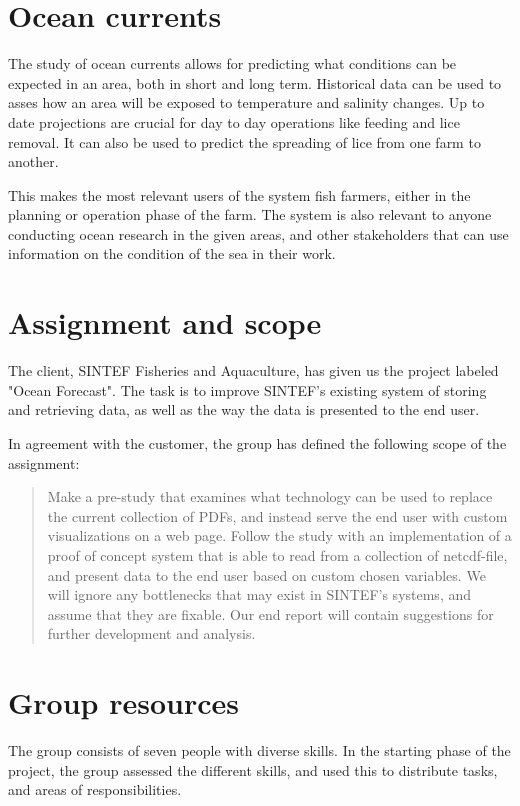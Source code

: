 \documentclass[11pt,a4paper,titlepage,oneside]{report}
\begin{document}
\section{Ocean currents}
The study of ocean currents allows for predicting what conditions can be expected in an area, both in short and long term. Historical data can be used to asses how an area will be exposed to temperature and salinity changes. Up to date projections are crucial for day to day operations like feeding and lice removal. It can also be used to predict the spreading of lice from one farm to another.

This makes the most relevant users of the system fish farmers, either in the planning or operation phase of the farm. The system is also relevant to anyone conducting ocean research in the given areas, and other stakeholders that can use information on the condition of the sea in their work.

\section{Assignment and scope}
The client, SINTEF Fisheries and Aquaculture, has given us the project labeled "Ocean Forecast". The task is to improve SINTEF's existing system of storing and retrieving data, as well as the way the data is presented to the end user. 

In agreement with the customer, the group has defined the following scope of the assignment:

\begin{quote}
Make a \gls{pre-study} that examines what technology can be used to replace the current collection of PDFs, and instead serve the end user with custom visualizations on a web page. Follow the study with an implementation of a \gls{proof of concept} system that is able to read from a collection of \gls{netcdf}-file, and present data to the end user based on custom chosen variables. We will ignore any bottlenecks that may exist in SINTEF's systems, and assume that they are fixable. Our end report will contain suggestions for further development and analysis.
\end{quote}

\section{Group resources}
\label{sec:GroupResources}
The group consists of seven people with diverse skills. In the starting phase of the project, the group assessed the different skills, and used this to distribute tasks, and areas of responsibilities. 
\end{document}
